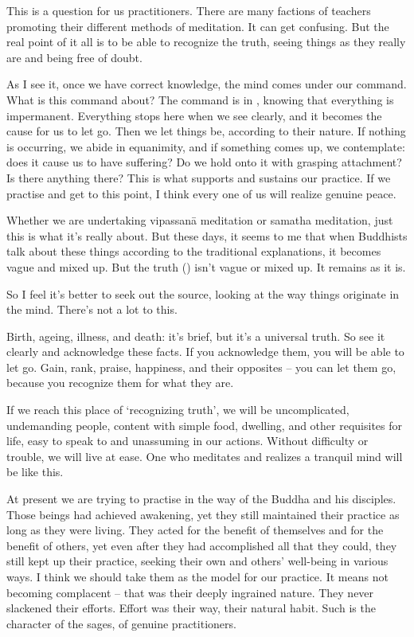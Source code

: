 This is a question for us practitioners. There are many factions of teachers promoting their different methods of meditation. It can get confusing. But the real point of it all is to be able to recognize the truth, seeing things as they really are and being free of doubt.

As I see it, once we have correct knowledge, the mind comes under our command. What is this command about? The command is in , knowing that everything is impermanent. Everything stops here when we see clearly, and it becomes the cause for us to let go. Then we let things be, according to their nature. If nothing is occurring, we abide in equanimity, and if something comes up, we contemplate: does it cause us to have suffering? Do we hold onto it with grasping attachment? Is there anything there? This is what supports and sustains our practice. If we practise and get to this point, I think every one of us will realize genuine peace.

Whether we are undertaking vipassan\=a meditation or samatha meditation, just this is what it's really about. But these days, it seems to me that when Buddhists talk about these things according to the traditional explanations, it becomes vague and mixed up. But the truth () isn't vague or mixed up. It remains as it is.

So I feel it's better to seek out the source, looking at the way things originate in the mind. There's not a lot to this.

Birth, ageing, illness, and death: it's brief, but it's a universal truth. So see it clearly and acknowledge these facts. If you acknowledge them, you will be able to let go. Gain, rank, praise, happiness, and their opposites -- you can let them go, because you recognize them for what they are.

If we reach this place of `recognizing truth', we will be uncomplicated, undemanding people, content with simple food, dwelling, and other requisites for life, easy to speak to and unassuming in our actions. Without difficulty or trouble, we will live at ease. One who meditates and realizes a tranquil mind will be like this.

At present we are trying to practise in the way of the Buddha and his disciples. Those beings had achieved awakening, yet they still maintained their practice as long as they were living. They acted for the benefit of themselves and for the benefit of others, yet even after they had accomplished all that they could, they still kept up their practice, seeking their own and others' well-being in various ways. I think we should take them as the model for our practice. It means not becoming complacent -- that was their deeply ingrained nature. They never slackened their efforts. Effort was their way, their natural habit. Such is the character of the sages, of genuine practitioners.

